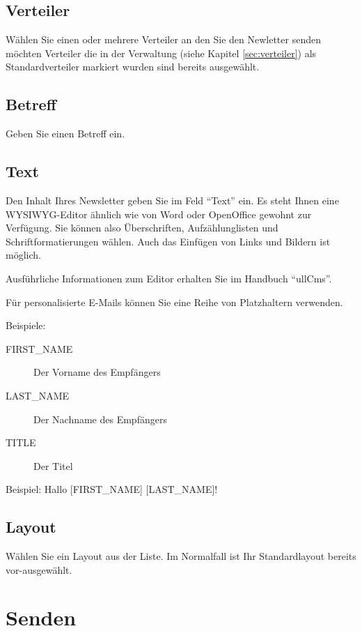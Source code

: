 \documentclass[article, a4paper, oneside, 11pt]{memoir}
\begin{document}
\subsection{Verteiler}

Wählen Sie einen oder mehrere Verteiler an den Sie den Newletter senden möchten
Verteiler die in der Verwaltung (siehe Kapitel \vref{sec:verteiler}) als Standardverteiler markiert wurden sind bereits ausgewählt.

\subsection{Betreff}

Geben Sie einen Betreff ein.

\subsection{Text}

Den Inhalt Ihres Newsletter geben Sie im Feld "`Text"' ein. Es steht Ihnen eine WYSIWYG-Editor ähnlich wie von Word oder OpenOffice gewohnt zur Verfügung. Sie können also Überschriften, Aufzählunglisten und Schriftformatierungen wählen. Auch das Einfügen von Links und Bildern ist möglich.

Ausführliche Informationen zum Editor erhalten Sie im Handbuch "`ullCms"'.

Für personalisierte E-Mails können Sie eine Reihe von Platzhaltern verwenden.

Beispiele:
\begin{description}
 \item[\lbrack FIRST\_NAME\rbrack] Der Vorname des Empfängers
 \item[\lbrack LAST\_NAME\rbrack] Der Nachname des Empfängers
 \item[\lbrack TITLE\rbrack] Der Titel
\end{description}

Beispiel: Hallo [FIRST\_NAME] [LAST\_NAME]!

\subsection{Layout}

Wählen Sie ein Layout aus der Liste. Im Normalfall ist Ihr Standardlayout bereits vor-ausgewählt.

\section{Senden}
\end{document}
